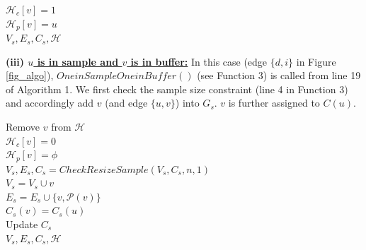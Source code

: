 
\begin{function2}[!t]
\caption{$OneinSampleOneNew(u,v,e_t,V_s,E_s,\mathcal{H},C_s)$}

$\mathcal{H}_c[v]=1$\\ 
$\mathcal{H}_p[v]=u$\\ 
\Return $V_s,E_s,C_s,\mathcal{H}$   
\end{function2}

\noindent\textbf{(iii) \underline{$u$ is in sample and $v$ is in buffer:}} In this case (edge $\{d,i\}$ in Figure \ref{fig_algo}), $OneinSampleOneinBuffer()$ (see Function 3) is called from line 19 of Algorithm 1. We first check the sample size constraint (line 4 in Function 3) and accordingly add $v$ (and edge $\{u,v\}$) into $G_s$. $v$ is further assigned to $C(u)$.

\begin{function3}[!h]
\caption{$OneinSampleOneinBuffer(u,v,e_t,V_s,E_s,\mathcal{H},C_s)$}
Remove $v$ from $\mathcal{H}$\\
$\mathcal{H}_c[v]=0$\\
$\mathcal{H}_p[v]=\phi$\\
$V_s,E_s,C_s = CheckResizeSample(V_s,C_s,n,1)$ \\
$V_s=V_s\cup v$\\
$E_s=E_s \cup \{ v,\mathcal{P}(v)\}$\\
$C_s(v)=C_s(u)$\\
Update $C_s$ \\
\Return $V_s,E_s,C_s,\mathcal{H}$   
\end{function3}

